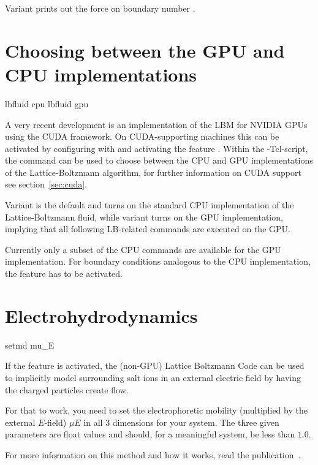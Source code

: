 Variant  prints out the force on boundary number
.

\section{Choosing between the GPU and CPU implementations}
\begin{essyntax}
   lbfluid cpu
   lbfluid gpu
  \begin{features}
  \end{features}
\end{essyntax}

A very recent development is an implementation of the LBM for NVIDIA
GPUs using the CUDA framework.  On CUDA-supporting machines this can
be activated by configuring with  and activating the feature .
Within the \es-Tcl-script, the  command can be used to
choose between the CPU and GPU implementations of the
Lattice-Boltzmann algorithm, for further information on CUDA support
see section~\ref{sec:cuda}.

Variant  is the default and turns on the standard CPU
implementation of the Lattice-Boltzmann fluid, while variant
 turns on the GPU implementation, implying that all
following LB-related commands are executed on the GPU.

Currently only a subset of the CPU commands are available for the GPU
implementation.  For boundary conditions analogous to the CPU
implementation, the feature  has to be
activated.


\section{Electrohydrodynamics}

\begin{essyntax}
  setmd mu_E   
  \begin{features}
  \end{features}
\end{essyntax}

If the feature  is activated, the
(non-GPU) Lattice Boltzmann Code can be used to implicitly model
surrounding salt ions in an external electric field by having the
charged particles create flow.

For that to work, you need to set the electrophoretic mobility
(multiplied by the external $E$-field) $\mu E$ in all 3 dimensions for
your system. The three given parameters are float values and should,
for a meaningful system, be less than $1.0$.

For more information on this method and how it works, read the
publication~\cite{hickey10a}.

